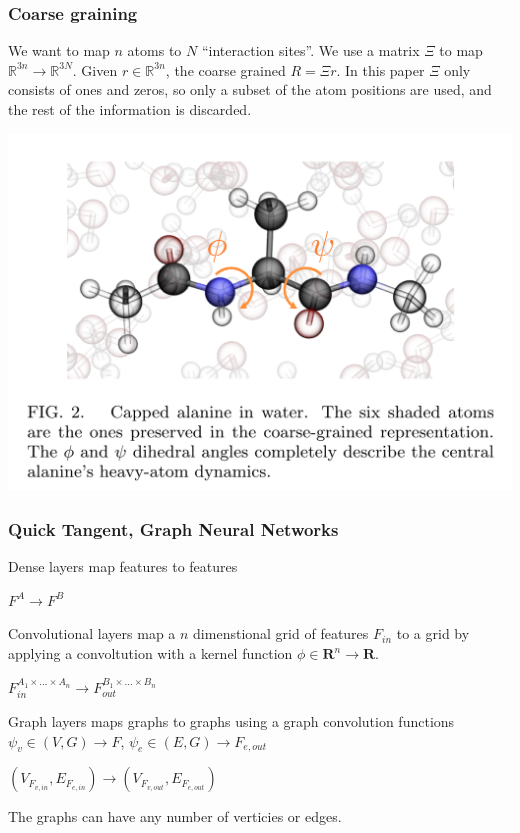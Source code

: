 \documentclass{beamer}
\begin{document}
\begin{frame}
  \frametitle{Coarse graining}
  We want to map $n$ atoms to $N$ ``interaction sites''. We use a matrix $\Xi$ to map $\mathbb{R}^{3n} \longrightarrow \mathbb{R}^{3N}$. Given $r \in \mathbb{R}^{3n}$, the coarse grained $R = \Xi r$. In this paper $\Xi$ only consists of ones and zeros, so only a subset of the atom positions are used, and the rest of the information is discarded.
  \begin{center}
    \includegraphics[width=0.7\linewidth]{./coarse_graining.png}
  \end{center}
\end{frame}
\begin{frame}
  \frametitle{Quick Tangent, Graph Neural Networks}
  Dense layers map features to features
  \begin{center}
    $F^A \longrightarrow F^B$
  \end{center}
  Convolutional layers map a $n$ dimenstional grid of features $F_{in}$ to a grid by applying a convoltution with a kernel function $\phi \in  \mathbf{R}^n \longrightarrow \mathbf{R}$.
  \begin{center}
    $F_{in}^{A_1 \times \dots \times A_n} \longrightarrow F_{out}^{B_1 \times \dots \times B_n}$
  \end{center}
  Graph layers maps graphs to graphs using a graph convolution functions $\psi_v \in (V, G) \longrightarrow F$, $\psi_e \in (E, G) \longrightarrow F_{e, out}$
  \begin{center}
    $(V_{F_{v, in}}, E_{F_{e, in}}) \longrightarrow (V_{F_{v, out}}, E_{F_{e, out}})$
  \end{center}
  The graphs can have any number of verticies or edges.
\end{frame}
\end{document}
